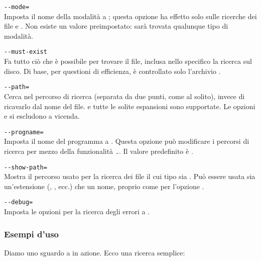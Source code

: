 \documentclass{article}
\begin{document}
\begin{ttdescription}
\item[\texttt{-{}-mode=\var{stringa}}]\mbox{}\\
  Imposta il nome della modalità a ; questa opzione ha
  effetto solo sulle ricerche dei file  e . Non esiste
  un valore preimpostato: sarà trovata qualunque tipo di modalità.
\item[\texttt{-{}-must-exist}]\mbox{}\\
  Fa tutto ciò che è possibile per trovare il file, inclusa nello
  specifico la ricerca sul disco. Di base, per questioni di efficienza, è
  controllato solo l'archivio .
\item[\texttt{-{}-path=\var{stringa}}]\mbox{}\\
  Cerca nel percorso di ricerca  (separata da due punti,
  come al solito), invece di ricavarlo dal nome del file. \samp{//} e
  tutte le solite espansioni sono supportate. Le opzioni  e
   si escludono a vicenda.
\item[\texttt{-{}-progname=\var{nome}}]\mbox{}\\
  Imposta il nome del programma a \texttt{}. Questa opzione può
  modificare i percorsi di ricerca per mezzo della funzionalità
  \texttt{.}. Il valore predefinito è
  .
\item[\texttt{-{}-show-path=\var{nome}}]\mbox{}\\
  Mostra il percorso usato per la ricerca dei file il cui tipo sia
  \texttt{}. Può essere usata sia un'estensione (,
  , ecc.) che un nome, proprio come per l'opzione
  .
\item[\texttt{-{}-debug=\var{num}}]\mbox{}\\
  Imposta le opzioni per la ricerca degli errori a \texttt{}.
\end{ttdescription}


\subsubsection{Esempi d'uso}
\label{sec:examples-of-use}

Diamo uno sguardo a \KPS{} in azione. Ecco una ricerca semplice:
\end{document}
